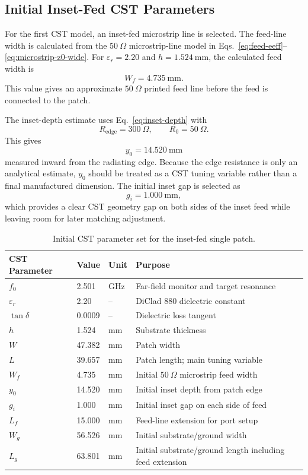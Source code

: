 \subsection{Initial Inset-Fed CST Parameters}
\label{subsec:initial-inset-fed-cst-parameters}

For the first CST model, an inset-fed microstrip line is selected. The feed-line width is calculated
from the \(50~\Omega\) microstrip-line model in Eqs.~\eqref{eq:feed-eeff}--\eqref{eq:microstrip-z0-wide}.
For \(\varepsilon_r=2.20\) and \(h=1.524~\mathrm{mm}\), the calculated feed width is
\[
    W_f=4.735~\mathrm{mm}.
\]
This value gives an approximate \(50~\Omega\) printed feed line before the feed is connected to the
patch.

The inset-depth estimate uses Eq.~\eqref{eq:inset-depth} with
\[
    R_{\mathrm{edge}}=300~\Omega,
    \qquad R_0=50~\Omega.
\]
This gives
\[
    y_0=14.520~\mathrm{mm}
\]
measured inward from the radiating edge. Because the edge resistance is only an analytical estimate,
\(y_0\) should be treated as a CST tuning variable rather than a final manufactured dimension. The
initial inset gap is selected as
\[
    g_i=1.000~\mathrm{mm},
\]
which provides a clear CST geometry gap on both sides of the inset feed while leaving room for later
matching adjustment.

\begin{table}[H]
\centering
\caption{Initial CST parameter set for the inset-fed single patch.}
\label{tab:initial-cst-single-patch-parameters}
\begin{tabularx}{\textwidth}{@{}lllX@{}}
\toprule
\textbf{CST Parameter} & \textbf{Value} & \textbf{Unit} & \textbf{Purpose} \\
\midrule
\(f_0\) & 2.501 & GHz & Far-field monitor and target resonance \\
\(\varepsilon_r\) & 2.20 & -- & DiClad 880 dielectric constant \\
\(\tan\delta\) & 0.0009 & -- & Dielectric loss tangent \\
\(h\) & 1.524 & mm & Substrate thickness \\
\(W\) & 47.382 & mm & Patch width \\
\(L\) & 39.657 & mm & Patch length; main tuning variable \\
\(W_f\) & 4.735 & mm & Initial \(50~\Omega\) microstrip feed width \\
\(y_0\) & 14.520 & mm & Initial inset depth from patch edge \\
\(g_i\) & 1.000 & mm & Initial inset gap on each side of feed \\
\(L_f\) & 15.000 & mm & Feed-line extension for port setup \\
\(W_g\) & 56.526 & mm & Initial substrate/ground width \\
\(L_g\) & 63.801 & mm & Initial substrate/ground length including feed extension \\
\bottomrule
\end{tabularx}
\end{table}


